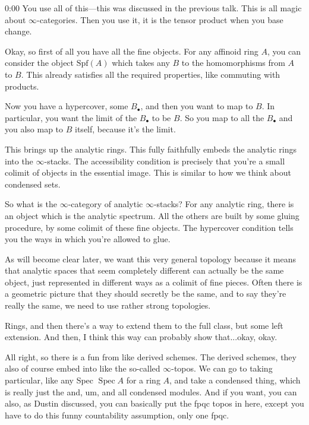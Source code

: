 \begin{unfinished}{0:00}
You use all of this---this was discussed in the previous talk. This is all magic about $\infty$-categories. Then you use it, it is the tensor product when you base change.

Okay, so first of all you have all the fine objects. For any affinoid ring $A$, you can consider the object $\mathrm{Spf}(A)$ which takes any $B$ to the homomorphisms from $A$ to $B$. This already satisfies all the required properties, like commuting with products.

Now you have a hypercover, some $B_\bullet$, and then you want to map to $B$. In particular, you want the limit of the $B_\bullet$ to be $B$. So you map to all the $B_\bullet$ and you also map to $B$ itself, because it's the limit.

This brings up the analytic rings. This fully faithfully embeds the analytic rings into the $\infty$-stacks. The accessibility condition is precisely that you're a small colimit of objects in the essential image. This is similar to how we think about condensed sets.

So what is the $\infty$-category of analytic $\infty$-stacks? For any analytic ring, there is an object which is the analytic spectrum. All the others are built by some gluing procedure, by some colimit of these fine objects. The hypercover condition tells you the ways in which you're allowed to glue.

As will become clear later, we want this very general topology because it means that analytic spaces that seem completely different can actually be the same object, just represented in different ways as a colimit of fine pieces. Often there is a geometric picture that they should secretly be the same, and to say they're really the same, we need to use rather strong topologies.




Rings, and then there's a way to extend them to the full class, but some left extension. And then, I think this way can probably show that...okay, okay. 

All right, so there is a fun from like derived schemes. The derived schemes, they also of course embed into like the so-called $\infty$-topos. We can go to taking particular, like any Spec $\operatorname{Spec} A$ for a ring $A$, and take a condensed thing, which is really just the and, um, and all condensed modules. And if you want, you can also, as Dustin discussed, you can basically put the fpqc topos in here, except you have to do this funny countability assumption, only one fpqc.


\end{unfinished}
